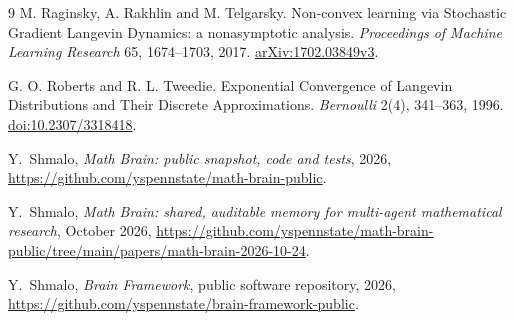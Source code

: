 \documentclass[11pt,letterpaper]{article}
\numberwithin{equation}{section}
\theoremstyle{remark}
\newcommand{\1}{\mathbf 1}
\begin{document}
\begin{thebibliography}{9}
M. Raginsky, A. Rakhlin and M. Telgarsky.
\newblock Non-convex learning via Stochastic Gradient Langevin Dynamics: a nonasymptotic analysis.
\newblock \emph{Proceedings of Machine Learning Research} 65, 1674--1703, 2017.
\newblock \href{https://arxiv.org/html/1702.03849v3}{arXiv:1702.03849v3}.

G. O. Roberts and R. L. Tweedie.
\newblock Exponential Convergence of Langevin Distributions and Their Discrete Approximations.
\newblock \emph{Bernoulli} 2(4), 341--363, 1996.
\newblock \href{https://doi.org/10.2307/3318418}{doi:10.2307/3318418}.

 Y.~Shmalo, \emph{Math Brain: public snapshot, code and tests}, 2026, \url{https://github.com/yspennstate/math-brain-public}.

 Y.~Shmalo, \emph{Math Brain: shared, auditable memory for multi-agent mathematical research}, October 2026, \url{https://github.com/yspennstate/math-brain-public/tree/main/papers/math-brain-2026-10-24}.

 Y.~Shmalo, \emph{Brain Framework}, public software repository, 2026, \url{https://github.com/yspennstate/brain-framework-public}.

\end{thebibliography}
\end{document}

